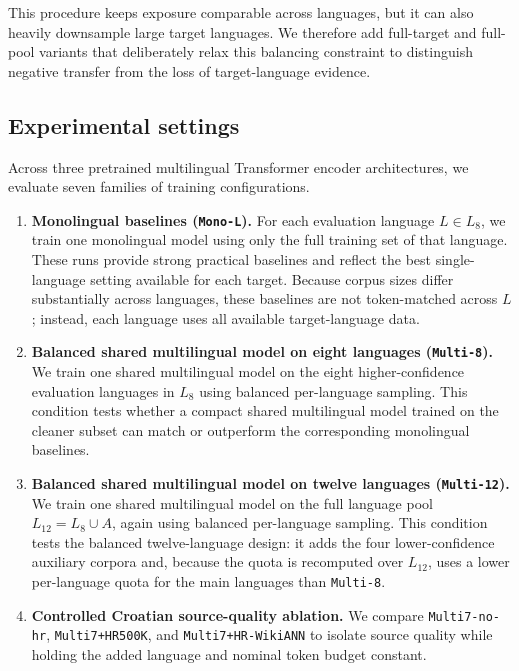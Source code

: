 \documentclass{article}
\begin{document}
This procedure keeps exposure comparable across languages, but it can also heavily downsample large target languages. 
We therefore add full-target and full-pool variants that deliberately relax this balancing constraint to distinguish negative transfer from the loss of target-language evidence.

\subsection{Experimental settings}
Across three pretrained multilingual Transformer encoder architectures, we evaluate seven families of training configurations.
\begin{enumerate}[leftmargin=*, itemsep=-2pt, topsep=-3pt]
    \item \textbf{Monolingual baselines (\texttt{Mono-L}).}
    For each evaluation language $L \in L_8$, we train one monolingual model using only the full training set of that language.
    These runs provide strong practical baselines and reflect the best single-language setting available for each target.
    Because corpus sizes differ substantially across languages, these baselines are not token-matched across $L$; instead, each language uses all available target-language data.

    \item \textbf{Balanced shared multilingual model on eight languages (\texttt{Multi-8}).}
    We train one shared multilingual model on the eight higher-confidence evaluation languages in $L_8$ using balanced per-language sampling.
    This condition tests whether a compact shared multilingual model trained on the cleaner subset can match or outperform the corresponding monolingual baselines.

    \item \textbf{Balanced shared multilingual model on twelve languages (\texttt{Multi-12}).}
    We train one shared multilingual model on the full language pool $L_{12} = L_8 \cup A$, again using balanced per-language sampling. 
    This condition tests the balanced twelve-language design: it adds the four lower-confidence auxiliary corpora and, because the quota is recomputed over $L_{12}$, uses a lower per-language quota for the main languages than \texttt{Multi-8}.

    \item \textbf{Controlled Croatian source-quality ablation.}
    We compare \texttt{Multi7-no-hr}, \texttt{Multi7+HR500K}, and \texttt{Multi7+HR-WikiANN} to isolate source quality while holding the added language and nominal token budget constant.


\end{enumerate}
\end{document}
